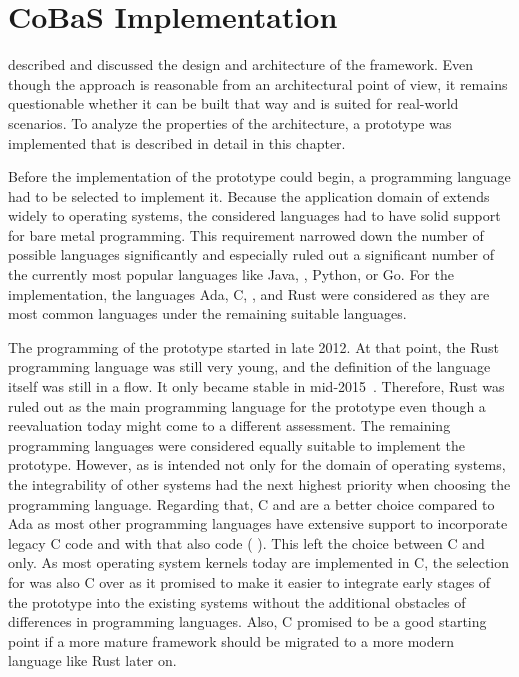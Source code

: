 \chapter{CoBaS Implementation}%
\label{chap:proto}

 described and discussed the design and architecture of the \cobas{} framework. Even though the approach is reasonable from an architectural point of view, it remains questionable whether it can be built that way and is suited for real-world scenarios. To analyze the properties of the \cobas{} architecture, a prototype was implemented that is described in detail in this chapter.

Before the implementation of the \cobas{} prototype could begin, a programming language had to be selected to implement it. Because the application domain of \cobas{} extends widely to operating systems, the considered languages had to have solid support for bare metal programming. This requirement narrowed down the number of possible languages significantly and especially ruled out a significant number of the currently most popular languages like Java, \Csh{}, Python, or Go. For the implementation, the languages Ada, C, \Cpp{}, and Rust were considered as they are most common languages under the remaining suitable languages.

The programming of the \cobas{} prototype started in late 2012. At that point, the Rust programming language was still very young, and the definition of the language itself was still in a flow. It only became stable in mid-2015~\cite{Rust-2015-Stable}. Therefore, Rust was ruled out as the main programming language for the prototype even though a reevaluation today might come to a different assessment. The remaining programming languages were considered equally suitable to implement the prototype. However, as \cobas{} is intended not only for the domain of operating systems, the integrability of other systems had the next highest priority when choosing the programming language. Regarding that, C and \Cpp{} are a better choice compared to Ada as most other programming languages have extensive support to incorporate legacy C code and with that also \Cpp{} code (\eg{} \cite[Annex B.2]{Ada2012}\cite[Sec.~5.9]{Rust}). This left the choice between C and \Cpp{} only. As most operating system kernels today are implemented in C, the selection for \cobas{} was also C over \Cpp{} as it promised to make it easier to integrate early stages of the prototype into the existing systems without the additional obstacles of differences in programming languages. Also, C promised to be a good starting point if a more mature framework should be migrated to a more modern language like Rust later on.

